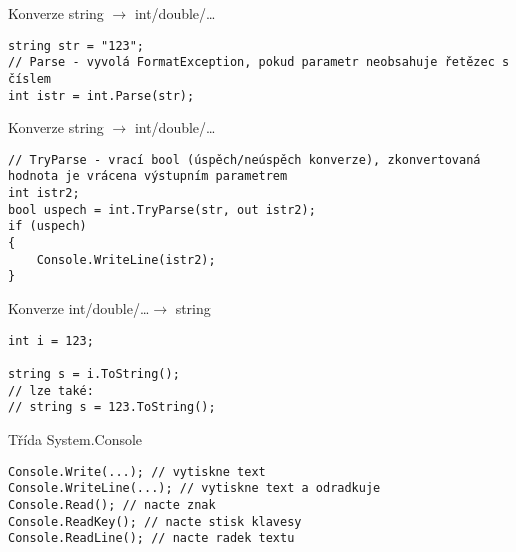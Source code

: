 \begin{frame}[fragile]
\begin{exampleblock}{Konverze string $\rightarrow$ int/double/\ldots}
\begin{lstlisting}
string str = "123";
// Parse - vyvolá FormatException, pokud parametr neobsahuje řetězec s číslem
int istr = int.Parse(str);
\end{lstlisting}
\end{exampleblock}

\begin{exampleblock}{Konverze string $\rightarrow$ int/double/\ldots}
\begin{lstlisting}
// TryParse - vrací bool (úspěch/neúspěch konverze), zkonvertovaná hodnota je vrácena výstupním parametrem
int istr2;
bool uspech = int.TryParse(str, out istr2);
if (uspech) 
{
    Console.WriteLine(istr2);
}

\end{lstlisting}
\end{exampleblock}
\end{frame}


\begin{frame}[fragile]
\begin{exampleblock}{Konverze int/double/\ldots $\rightarrow$ string}
\begin{lstlisting}
int i = 123;

string s = i.ToString();
// lze také:
// string s = 123.ToString();
\end{lstlisting}
\end{exampleblock}
\end{frame}


\begin{frame}[fragile]
\begin{exampleblock}{Třída System.Console}
\begin{lstlisting}
Console.Write(...); // vytiskne text
Console.WriteLine(...); // vytiskne text a odradkuje
Console.Read(); // nacte znak
Console.ReadKey(); // nacte stisk klavesy
Console.ReadLine(); // nacte radek textu
\end{lstlisting}
\end{exampleblock}
\end{frame}
